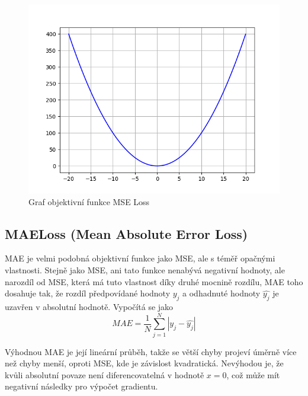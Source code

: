 \begin{figure}[H]
    \centering
    \includegraphics[scale=0.4]{obrazky-figures/mseloss.png}
    \caption{\label{fig:mseloss}Graf objektivní funkce MSE Loss}
\end{figure}


\subsection*{MAELoss (Mean Absolute Error Loss)}
MAE je velmi podobná objektivní funkce jako MSE, ale s téměř opačnými vlastnosti. Stejně jako MSE, ani tato funkce nenabývá negativní hodnoty, ale narozdíl od MSE, která má tuto vlastnost díky druhé mocnině rozdílu, MAE toho dosahuje tak, že rozdíl předpovídané hodnoty $y_j$ a odhadnuté hodnoty $\hat{y_j}$ je uzavřen v absolutní hodnotě. Vypočítá se jako
\begin{equation}
  MAE = \frac{1}{N}\sum_{j=1}^N|y_j - \hat{y_j}|
\end{equation}

Výhodnou MAE je její lineární průběh, takže se větší chyby projeví úměrně více než chyby menší, oproti MSE, kde je závislost kvadratická. Nevýhodou je, že kvůli absolutní povaze není diferencovatelná v hodnotě $x=0$, což může mít negativní následky pro výpočet gradientu.

